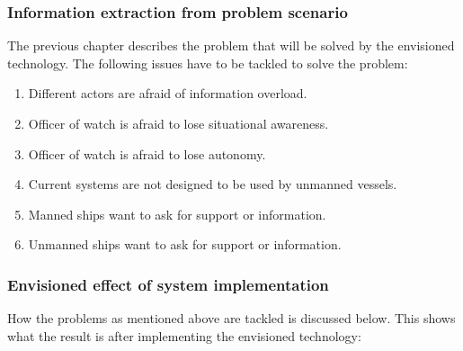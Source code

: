 \subsubsection{Information extraction from problem scenario}
The previous chapter describes the problem that will be solved by the envisioned technology. The following issues have to be tackled to solve the problem:
\begin{spacing}{1}
	\begin{enumerate}
		\item Different actors are afraid of information overload.
		\item Officer of watch is afraid to lose situational awareness.
		\item Officer of watch is afraid to lose autonomy.
		\item Current systems are not designed to be used by unmanned vessels.
		\item Manned ships want to ask for support or information.
		\item Unmanned ships want to ask for support or information.
	\end{enumerate}
\end{spacing}

\subsubsection{Envisioned effect of system implementation}
How the problems as mentioned above are tackled is discussed below. This shows what the result is after implementing the envisioned technology:

